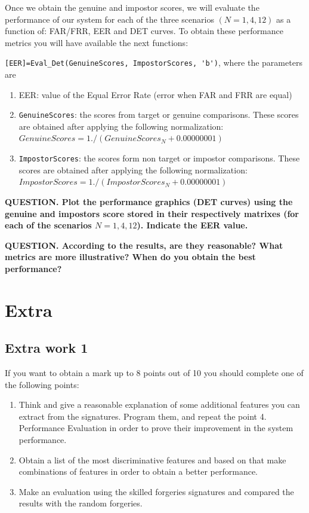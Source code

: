 \documentclass[a4paper]{article}
\def\inline{\lstinline[basicstyle=\ttfamily,keywordstyle={}]}
\begin{document}
{Once we obtain the genuine and impostor scores, we will evaluate the performance of our system for each of the three scenarios \((N=1,4,12)\) as a function of: FAR/FRR, EER and DET curves.
To obtain these performance metrics you will have available the next functions:



\inline{[EER]=Eval_Det(GenuineScores, ImpostorScores, 'b')}, where the parameters are
\begin{enumerate}
\item	EER: value of the Equal Error Rate (error when FAR and FRR are equal)
\item	\inline{GenuineScores}: the scores from target or genuine comparisons. These scores are obtained after applying the following normalization: \(GenuineScores = 1./(GenuineScores_N+0.00000001)\)
\item	\inline{ImpostorScores}: the scores form non target or impostor comparisons. These scores are obtained after applying the following normalization: \(ImpostorScores =1./(ImpostorScores_N+0.00000001)\)
\end{enumerate}

\textbf{QUESTION. Plot the performance graphics (DET curves) using the genuine and impostors score stored in their respectively matrixes (for each of the scenarios \(N=1,4,12\)). Indicate the EER value.}


\textbf{QUESTION. According to the results, are they reasonable? What metrics are more illustrative? When do you obtain the best performance? }


\section{Extra}

\subsection{Extra work 1}
 If you want to obtain a mark up to 8 points out of 10 you should complete one of the following points:
 \begin{enumerate}
\item Think and give a reasonable explanation of some additional features you can extract from the signatures. Program them, and repeat the point 4. Performance Evaluation in order to prove their improvement in the system performance. 
\item 	Obtain a list of the most discriminative features and based on that make combinations of features in order to obtain a better performance.
\item 	Make an evaluation using the skilled forgeries signatures and compared the results with the random forgeries.
 \end{enumerate}

}
\end{document}
